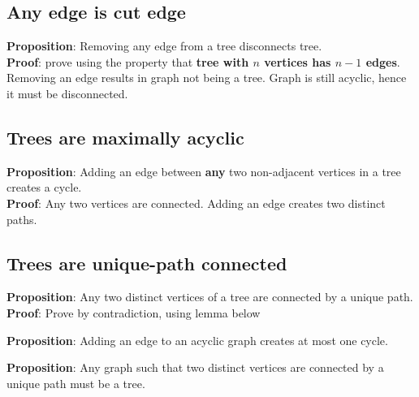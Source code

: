 \subsection{Any edge is cut edge}
\begin{framed}
   \textbf{Proposition}: Removing any edge from a tree disconnects tree. \\

   \textbf{Proof}: prove using the property that \textbf{tree with $n$ vertices has $n - 1$ edges}. Removing an edge results in graph not being a tree. Graph is still acyclic, hence it must be disconnected. 
\end{framed}

\subsection{Trees are maximally acyclic}

\begin{framed}
   \textbf{Proposition}: Adding an edge between \textbf{any} two non-adjacent vertices in a tree creates a cycle. \\

   \textbf{Proof}: Any two vertices are connected. Adding an edge creates two distinct paths. 
\end{framed}

\subsection{Trees are unique-path connected}
\begin{framed}
   \textbf{Proposition}: Any two distinct vertices of a tree are connected by a unique path. \\

   \textbf{Proof}: Prove by contradiction, using lemma below
\end{framed}

\begin{framed}
   \textbf{Proposition}: Adding an edge to an acyclic graph creates at most one cycle.
\end{framed}

\begin{framed}
   \textbf{Proposition}: Any graph such that two distinct vertices are connected by a unique path must be a tree. \\
\end{framed}














